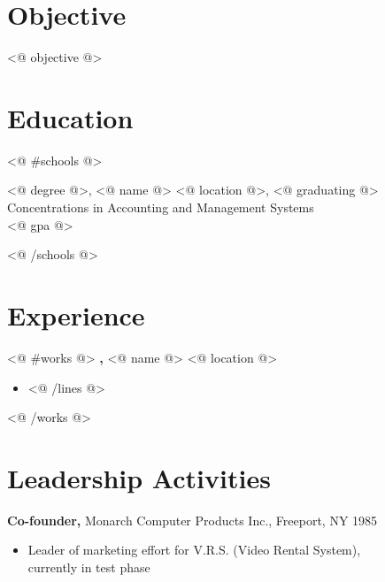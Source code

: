 \documentclass[margin]{res}
\begin{document}
 
 
 
 \address{<@ location @>, \\ <@ phone @>}

 
\begin{resume} 
 
\section{Objective} 
<@ objective @>

\section{Education}
<@ #schools @>

<@ degree @>, <@ name @> <@ location @>, <@ graduating @> \\
Concentrations in Accounting and Management Systems \\
<@ gpa @>
 
<@ /schools @>

\section{Experience}

<@ #works @>
 {\bf <@ position @>,} <@ name @> <@ location @> 
 \begin{itemize} \itemsep -2pt  %
 <@ #lines @>
   \item <@ line @>
 <@ /lines @>
 \end{itemize}

<@ /works @>

\section{Leadership   Activities} 
               {\bf Co-founder,} Monarch Computer Products Inc., Freeport, NY    \hfill         1985 
                \begin{itemize} \itemsep -2pt
              \item Leader of marketing effort for V.R.S. (Video 
                 Rental System), \\
                  currently in test phase 
                 

\end{itemize}
\end{resume}
\end{document}
